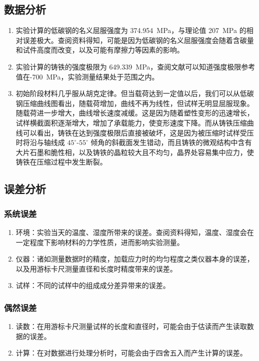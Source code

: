     \subsection{数据分析}
        \begin{enumerate}
            \item 实验计算的低碳钢的名义屈服强度为 \SI{374.954}{\MPa}，与理论值 \SI{207}{\MPa} 的相对误差极大。查阅资料得知，可能是因为低碳钢的名义屈服强度会随着含碳量和试件高度而改变，以及可能有摩擦力等因素的影响。
            \item 实验计算的铸铁的强度极限为 \SI{649.339}{\MPa}，查阅文献可以知道强度极限参考值在-\SI{700}{\MPa}，实验测量结果处于范围之内。
            \item 初始阶段材料几乎服从胡克定律。但当载荷达到一定值以后，我们可以从低碳钢压缩曲线图看出，随载荷增加，曲线不再为线性，但试样无明显屈服现象。随载荷进一步增大，曲线增长速度减缓。这是因为随着塑性变形的迅速增长，试样横截面积逐渐增大，增加了承载能力，使变形速度下降。而从铸铁压缩曲线可以看出，铸铁在达到强度极限后直接被破坏，这是因为被压缩时试样受压时将沿与轴线成 $45^\circ$-$55^\circ$ 倾角的斜截面发生错动，而且铸铁的微观结构中含有大片石墨和脆性相，以及铸铁的晶粒较大且不均匀，晶界处容易集中应力，使铸铁在压缩过程中发生断裂。
        \end{enumerate}
    \subsection{误差分析}
    \subsubsection{系统误差}
    \begin{enumerate}
        \item 环境：实验当天的温度、湿度所带来的误差。查阅资料得知，温度、湿度会在一定程度下影响材料的力学性质，进而影响实验测量。
        \item 仪器：诸如测量数据时的精度，加载应力时的均匀程度之类仪器本身的误差，以及用游标卡尺测量直径和长度时精度带来的误差。
        \item 试样：不同的试样中的组成成分差异带来的误差。
    \end{enumerate}
    \subsubsection{偶然误差}
    \begin{enumerate}
        \item 读数：在用游标卡尺测量试样的长度和直径时，可能会由于估读而产生读取数据的误差。
        \item 计算：在对数据进行处理分析时，可能会由于四舍五入而产生计算的误差。
    \end{enumerate}
